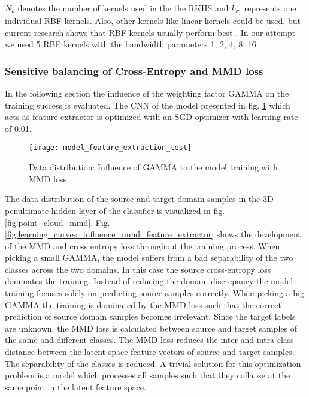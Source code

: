 $N_{k}$ denotes the number of kernels used in the the RKHS and $k_{\sigma_{i}}$ represents one individual RBF kernels. Also, other kernels like linear kernels could be used, but current research shows that RBF kernels usually perform best \cite{AZAMFAR2020103932}. In our attempt we used 5 RBF kernels with the bandwidth parameters 1, 2, 4, 8, 16.


\subsubsection{Sensitive balancing of Cross-Entropy and MMD loss} \label{sec:Balancing Cross-Entropy and MMD loss}

In the following section the influence of the weighting factor GAMMA on the training success is evaluated. The CNN of the model presented in fig. \ref{fig:model_feature_extraction_test} which acts as feature extractor is optimized with an SGD optimizer with learning rate of 0.01.


\begin{figure}[htpb]
  \centering
  \texttt{[image: model\_feature\_extraction\_test]}
  \caption {Data distribution: Influence of GAMMA to the model training with MMD loss} \label{fig:model_feature_extraction_test}
\end{figure}


The data distribution of the source and target domain samples in the 3D penultimate hidden layer of the classifier is visualized in fig. \ref{fig:point_cloud_mmd}. Fig. \ref{fig:learning_curves_influence_mmd_feature_extractor} shows the development of the MMD and cross entropy loss throughout the training process. When picking a small GAMMA, the model suffers from a bad separability of the two classes across the two domains. In this case the source cross-entropy loss dominates the training. Instead of reducing the domain discrepancy the model training focuses solely on predicting source samples correctly. When picking a big GAMMA the training is dominated by the MMD loss such that the correct prediction of source domain samples becomes irrelevant. Since the target labels are unknown, the MMD loss is calculated between source and target samples of the same and different classes. The MMD loss reduces the inter and intra class distance between the latent space feature vectors of source and target samples. The separability of the classes is reduced. A trivial solution for this optimization problem is a model which processes all samples such that they collapse at the same point in the latent feature space.







